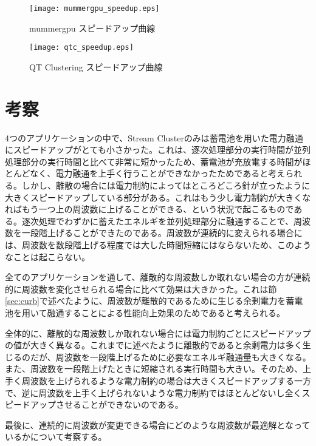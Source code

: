 \begin{figure}[t]
 \begin{center}
  \texttt{[image: mummergpu\_speedup.eps]}
 \end{center}
 \caption{mummergpu スピードアップ曲線}
 \label{fig:mummergpu_speedup}
\end{figure}

\begin{figure}[t]
 \begin{center}
  \texttt{[image: qtc\_speedup.eps]}
 \end{center}
 \caption{QT Clustering スピードアップ曲線}
 \label{fig:qtclustering_speedup}
\end{figure}


\section{考察}
\label{sec:discussion}

4つのアプリケーションの中で、Stream Clusterのみは蓄電池を用いた電力融通にスピードアップがとても小さかった。これは、逐次処理部分の実行時間が並列処理部分の実行時間と比べて非常に短かったため、蓄電池が充放電する時間がほとんどなく、電力融通を上手く行うことができなかったためであると考えられる。しかし、離散の場合には電力制約によってはところどころ針が立ったように大きくスピードアップしている部分がある。これはもう少し電力制約が大きくなればもう一つ上の周波数に上げることができる、という状況で起こるものである。逐次処理でわずかに蓄えたエネルギを並列処理部分に融通することで、周波数を一段階上げることができたのである。周波数が連続的に変えられる場合には、周波数を数段階上げる程度では大した時間短縮にはならないため、このようなことは起こらない。

全てのアプリケーションを通して、離散的な周波数しか取れない場合の方が連続的に周波数を変化させられる場合に比べて効果は大きかった。これは節\ref{sec:curb}で述べたように、周波数が離散的であるために生じる余剰電力を蓄電池を用いて融通することによる性能向上効果のためであると考えられる。

全体的に、離散的な周波数しか取れない場合には電力制約ごとにスピードアップの値が大きく異なる。これまでに述べたように離散的であると余剰電力は多く生じるのだが、周波数を一段階上げるために必要なエネルギ融通量も大きくなる。また、周波数を一段階上げたときに短縮される実行時間も大きい。そのため、上手く周波数を上げられるような電力制約の場合は大きくスピードアップする一方で、逆に周波数を上手く上げられないような電力制約ではほとんどないし全くスピードアップさせることができないのである。

最後に、連続的に周波数が変更できる場合にどのような周波数が最適解となっているかについて考察する。









